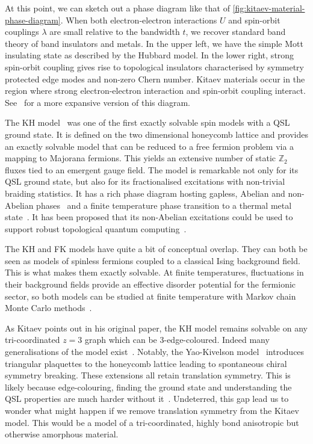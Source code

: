 At this point, we can sketch out a phase diagram like that of \cref{fig:kitaev-material-phase-diagram}. When both electron-electron interactions \(U\) and spin-orbit couplings \(\lambda\) are small relative to the bandwidth \(t\), we recover standard band theory of band insulators and metals. In the upper left, we have the simple Mott insulating state as described by the Hubbard model. In the lower right, strong spin-orbit coupling gives rise to topological insulators characterised by symmetry protected edge modes and non-zero Chern number. Kitaev materials occur in the region where strong electron-electron interaction and spin-orbit coupling interact. See~\autocite{witczak-krempaCorrelatedQuantumPhenomena2014} for a more expansive version of this diagram.

The KH model~\autocite{kitaevAnyonsExactlySolved2006} was one of the first exactly solvable spin models with a QSL ground state. It is defined on the two dimensional honeycomb lattice and provides an exactly solvable model that can be reduced to a free fermion problem via a mapping to Majorana fermions. This yields an extensive number of static \(\mathbb Z_2\) fluxes tied to an emergent gauge field. The model is remarkable not only for its QSL ground state, but also for its fractionalised excitations with non-trivial braiding statistics. It has a rich phase diagram hosting gapless, Abelian and non-Abelian phases~\autocite{knolleDynamicsFractionalizationQuantum2015} and a finite temperature phase transition to a thermal metal state~\autocite{selfThermallyInducedMetallic2019}. It has been proposed that its non-Abelian excitations could be used to support robust topological quantum computing~\autocite{kitaev_fault-tolerant_2003,freedmanTopologicalQuantumComputation2003,nayakNonAbelianAnyonsTopological2008}.

The KH and FK models have quite a bit of conceptual overlap. They can both be seen as models of spinless fermions coupled to a classical Ising background field. This is what makes them exactly solvable. At finite temperatures, fluctuations in their background fields provide an effective disorder potential for the fermionic sector, so both models can be studied at finite temperature with Markov chain Monte Carlo methods~\autocite{antipovInteractionTunedAndersonMott2016,selfThermallyInducedMetallic2019}.

As Kitaev points out in his original paper, the KH model remains solvable on any tri-coordinated \(z=3\) graph which can be 3-edge-coloured. Indeed many generalisations of the model exist~\autocite{Baskaran2007,Baskaran2008,Nussinov2009,OBrienPRB2016,hermanns2015weyl}. Notably, the Yao-Kivelson model~\autocite{yaoExactChiralSpin2007} introduces triangular plaquettes to the honeycomb lattice leading to spontaneous chiral symmetry breaking. These extensions all retain translation symmetry. This is likely because edge-colouring, finding the ground state and understanding the QSL properties are much harder without it~\autocite{eschmann2019thermodynamics,Peri2020}. Undeterred, this gap lead us to wonder what might happen if we remove translation symmetry from the Kitaev model. This would be a model of a tri-coordinated, highly bond anisotropic but otherwise amorphous material.

